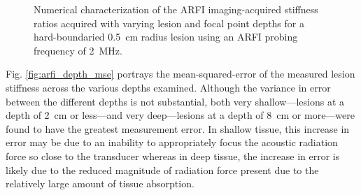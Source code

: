 			\begin{figure}[!htb]
				\centering
				\caption[Numerical characterization of ARFI imaging-acquired stiffness ratio with changing lesion depth]{Numerical characterization of the ARFI imaging-acquired stiffness ratios acquired with varying lesion and focal point depths for a hard-boundaried \SI{0.5}{cm} radius lesion using an ARFI probing frequency of \SI{2}{\MHz}.}
				\label{fig:arfi_depth}
			\end{figure}

			Fig. \ref{fig:arfi_depth_mse} portrays the mean-squared-error of the measured lesion stiffness across the various depths examined. Although the variance in error between the different depths is not substantial, both very shallow---lesions at a depth of \SI{2}{\cm} or less---and very deep---lesions at a depth of \SI{8}{\cm} or more---were found to have the greatest measurement error. In shallow tissue, this increase in error may be due to an inability to appropriately focus the acoustic radiation force so close to the transducer whereas in deep tissue, the increase in error is likely due to the reduced magnitude of radiation force present due to the relatively large amount of tissue absorption.

